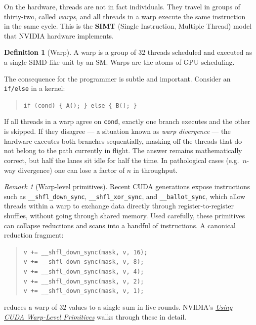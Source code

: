 \documentclass[11pt,a4paper]{article}
\theoremstyle{definition}
\newtheorem{definition}{Definition}[section]
\theoremstyle{remark}
\newtheorem*{remark}{Remark}
\theoremstyle{plain}
\begin{document}
On the hardware, threads are not in fact individuals. They travel in
groups of thirty-two, called \emph{warps}, and all threads in a
warp execute the same instruction in the same cycle. This is the
\textbf{SIMT} (Single Instruction, Multiple Thread) model that
NVIDIA hardware implements.

\begin{definition}[Warp]
A warp is a group of $32$ threads scheduled and executed as a
single SIMD-like unit by an SM. Warps are the atoms of GPU
scheduling.
\end{definition}

The consequence for the programmer is subtle and important. Consider
an \texttt{if/else} in a kernel:

\begin{quote}\small
\texttt{if (cond) \{ A(); \} else \{ B(); \}}
\end{quote}

If all threads in a warp agree on \texttt{cond}, exactly one branch
executes and the other is skipped. If they disagree --- a situation
known as \emph{warp divergence} --- the hardware executes both
branches sequentially, masking off the threads that do not belong to
the path currently in flight. The answer remains mathematically
correct, but half the lanes sit idle for half the time. In
pathological cases (e.g.\ $n$-way divergence) one can lose a factor
of $n$ in throughput.

\begin{remark}[Warp-level primitives]
Recent CUDA generations expose instructions such as
\texttt{\_\_shfl\_down\_sync}, \texttt{\_\_shfl\_xor\_sync}, and
\texttt{\_\_ballot\_sync}, which allow threads within a warp to
exchange data directly through register-to-register shuffles, without
going through shared memory. Used carefully, these primitives can
collapse reductions and scans into a handful of instructions. A
canonical reduction fragment:
\begin{quote}\small
\texttt{v += \_\_shfl\_down\_sync(mask, v, 16);} \\
\texttt{v += \_\_shfl\_down\_sync(mask, v, \phantom{1}8);} \\
\texttt{v += \_\_shfl\_down\_sync(mask, v, \phantom{1}4);} \\
\texttt{v += \_\_shfl\_down\_sync(mask, v, \phantom{1}2);} \\
\texttt{v += \_\_shfl\_down\_sync(mask, v, \phantom{1}1);}
\end{quote}
reduces a warp of $32$ values to a single sum in five rounds. NVIDIA's
\href{https://developer.nvidia.com/blog/using-cuda-warp-level-primitives/}{\textit{Using
CUDA Warp-Level Primitives}} walks through these in detail.
\end{remark}
\end{document}
